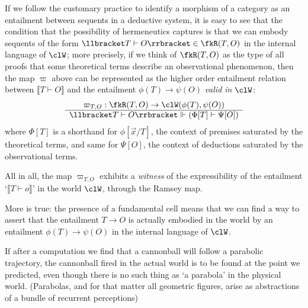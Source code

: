 \begin{remark}
If we follow the customary practice to identify a morphism of a category as an entailment between sequents in a deductive system, it is easy to see that the condition that the possibility of hermeneutics captures is that we can embody sequents of the form $\llbracket T\vdash O\rrbracket \in \fkR(T,O)$ in the internal language of $\clW$; more precisely, if we think of $\fkR(T,O)$ as the type of all proofs that some theoretical terms describe an observational phenomenon, then the map $\varpi$ above can be represented as the higher order entailment relation between $\llbracket T\vdash O\rrbracket$ and the entailment $\phi(T) \to \psi(O)$ \emph{valid in $\clW$}:
\[ \begin{array}{c}
	\varpi_{T,O} : \fkR(T,O) \to \clW(\phi(T),\psi(O)) \\ \hline 
	\llbracket T\vdash O\rrbracket \Vdash (\Phi[T] \vdash \Psi[O])
\end{array} \] 
where $\Phi[T]$ is a shorthand for $\phi[\vec x/T]$, the context of premises saturated by the theoretical terms, and same for $\Psi[O]$, the context of deductions saturated by the observational terms. 
\end{remark}
All in all, the map $\varpi_{T,O}$ exhibits a \emph{witness} of the expressibility of the entailment `$\llbracket T\vdash o\rrbracket$' in the world $\clW$, through the Ramsey map.

More is true: the presence of a fundamental cell means that we can find a way to assert that the entailment $T\to O$ is actually embodied in the world by an entailment $\phi(T)\to \psi(O)$ in the internal language of $\clW$.

If after a computation we find that a cannonball will follow a parabolic trajectory, the cannonball fired in the actual world is to be found at the point we predicted, even though there is no such thing as `a parabola' in the physical world. (Parabolas, and for that matter all geometric figures, arise as abstractions of a bundle of recurrent perceptions)

